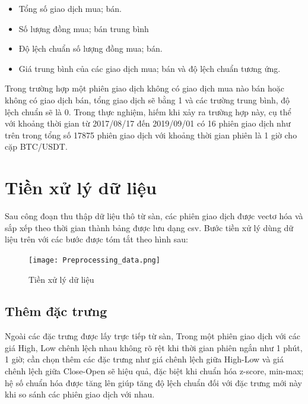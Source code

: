 \begin{itemize}
    \item Tổng số giao dịch mua; bán.
    \item Số lượng đồng mua; bán trung bình
    \item Độ lệch chuẩn số lượng đồng mua; bán.
    \item Giá trung bình của các  giao dịch mua; bán và độ lệch chuẩn tương ứng.
\end{itemize}
Trong trường hợp một phiên giao dịch không có giao dịch mua nào bán hoặc không có giao dịch bán, tổng giao dịch sẽ bằng 1 và các trường trung bình, độ lệch chuẩn sẽ là 0. Trong thực nghiệm, hiếm khi xảy ra trường hợp này, cụ thể với khoảng thời gian từ 2017/08/17 đến 2019/09/01 có 16 phiên giao dịch như trên trong tổng số  17875 phiên giao dịch với khoảng thời gian phiên là 1 giờ cho cặp BTC/USDT.\\


\section{Tiền xử lý dữ liệu}
Sau công đoạn thu thập dữ liệu thô từ sàn, các phiên giao dịch được vectơ hóa và sắp xếp theo thời gian thành bảng được lưu dạng csv. Bước tiền xử lý dùng dữ liệu trên với các bước được tóm tắt theo hình sau:
\begin{figure}[H]
	\center	\texttt{[image: Preprocessing\_data.png]}
	\caption{Tiền xử lý dữ liệu}
	\label{fig:Preprocessing_data}

\end{figure}


\subsection{Thêm đặc trưng}
Ngoài các đặc trưng được lấy trực tiếp từ sàn, Trong một phiên giao dịch với các giá High, Low chênh lệch nhau không rõ rệt khi thời gian phiên ngắn như 1 phút, 1 giờ; cần chọn thêm các đặc trưng như giá chênh lệch giữa High-Low và giá chênh lệch giữa Close-Open sẽ hiệu quả, đặc biệt khi chuẩn hóa z-score, min-max; hệ số chuẩn hóa được tăng lên giúp tăng độ lệch chuẩn đối với đặc trưng mới này khi so sánh các phiên giao dịch với nhau.
